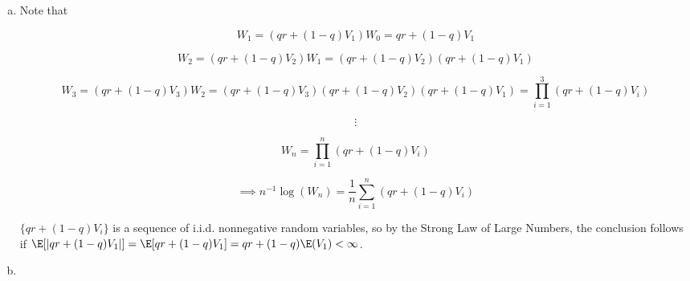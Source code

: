 \begin{solution}

\begin{enumerate}[(a)]

\item

Note that 

\[
W_1 = (qr + (1 - q)V_1)W_0 = qr + (1 - q)V_1
\]

\[
W_2 = (qr + (1 - q)V_2)W_1 = (qr + (1 - q)V_2)(qr + (1 - q)V_1)
\]

\[
W_3 = (qr + (1 - q)V_3)W_2 = (qr + (1 - q)V_3) (qr + (1 - q)V_2)(qr + (1 - q)V_1) = \prod_{i=1}^3 (qr + (1 - q)V_i) 
\]

\[
\vdots
\]

\[
W_n = \prod_{i=1}^n (qr + (1 - q)V_i) 
\]

\[
\implies n^{-1} \log (W_n) = \frac{1}{n} \sum_{i=1}^n (qr + (1 - q)V_i) 
\]

\( \{qr + (1 - q)V_i \}\) is a sequence of i.i.d. nonnegative random variables, so by the Strong Law of Large Numbers, the conclusion follows if \( \E[ \left| qr + (1 - q)V_1 \right|] = \E[qr + (1 - q)V_1]   =qr + (1-q)\E(V_1) < \infty \).

%
%
%
%
%

\item


%
%
%
% 



\end{enumerate}
\end{solution}

